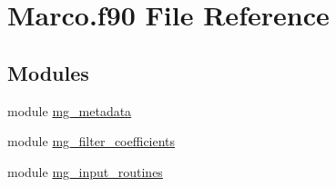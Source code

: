 \hypertarget{Marco_8f90}{}\section{Marco.\+f90 File Reference}
\label{Marco_8f90}
\subsection*{Modules}
\begin{DoxyCompactItemize}
\item 
module \hyperlink{namespacemg__metadata}{mg\+\_\+metadata}
\item 
module \hyperlink{namespacemg__filter__coefficients}{mg\+\_\+filter\+\_\+coefficients}
\item 
module \hyperlink{namespacemg__input__routines}{mg\+\_\+input\+\_\+routines}
\end{DoxyCompactItemize}
